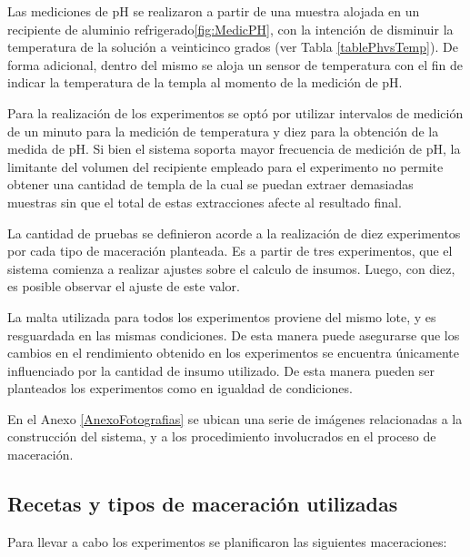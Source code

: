         \par Las mediciones de pH se realizaron a partir de una muestra alojada en un recipiente de aluminio refrigerado\ref{fig:MedicPH}, con la intención de disminuir la temperatura de la solución a veinticinco grados (ver Tabla \ref{tablePhvsTemp}). De forma adicional, dentro del mismo se aloja un sensor de temperatura con el fin de indicar la temperatura de la templa al momento de la medición de pH.
        
        \par Para la realización de los experimentos se optó por utilizar intervalos de medición de un minuto para la medición de temperatura y diez para la obtención de la medida de pH. Si bien el sistema soporta mayor frecuencia de medición de pH, la limitante del volumen del recipiente empleado para el experimento no permite obtener una cantidad de templa de la cual se puedan extraer demasiadas muestras sin que el total de estas extracciones afecte al resultado final.
        
        \par La cantidad de pruebas se definieron acorde a la realización de diez experimentos por cada tipo de maceración planteada. Es a partir de tres experimentos, que el sistema comienza a realizar ajustes sobre el calculo de insumos. Luego, con diez, es posible observar el ajuste de este valor.
        
        \par La malta utilizada para todos los experimentos proviene del mismo lote, y es resguardada en las mismas condiciones. De esta manera puede asegurarse que los cambios en el rendimiento obtenido en los experimentos se encuentra únicamente influenciado por la cantidad de insumo utilizado. De esta manera pueden ser planteados los experimentos como en igualdad de condiciones.
        
        En el Anexo \ref{AnexoFotografias} se ubican una serie de imágenes relacionadas a la construcción del sistema, y a los procedimiento involucrados en el proceso de maceración.
    \subsection{Recetas y tipos de maceración utilizadas}
        \par Para llevar a cabo los experimentos se planificaron las siguientes maceraciones:
